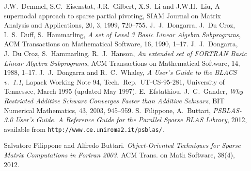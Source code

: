 \begin{thebibliography}{99}
J.W.~Demmel, S.C.~Eisenstat, J.R.~Gilbert, X.S.~Li and J.W.H.~Liu,
A supernodal approach to sparse partial pivoting,
SIAM Journal on Matrix Analysis and Applications, 20, 3, 1999, 720--755.
%
J.~J.~Dongarra, J.~Du Croz, I.~S.~Duff, S.~Hammarling,
\emph{A set of Level 3 Basic Linear Algebra Subprograms},
ACM Transactions on Mathematical Software, 16, 1990, 1--17.
%
J.~J.~Dongarra, J.~Du Croz, S.~Hammarling, R.~J.~Hanson,
\emph{An extended set of FORTRAN Basic Linear Algebra Subprograms},
ACM Transactions on Mathematical Software, 14, 1988, 1--17.
%
J.~J.~Dongarra and R.~C.~Whaley,
{\em A User's Guide to the BLACS v.~1.1},
Lapack Working Note 94, Tech.\ Rep.\ UT-CS-95-281, University of
Tennessee, March 1995 (updated May 1997).
%
%
%
E.~Efstathiou, J.~G.~Gander,
{\em Why Restricted Additive Schwarz Converges Faster than Additive Schwarz},
BIT Numerical Mathematics, 43, 2003, 945--959.
%
S.~Filippone, A.~Buttari, 
{\em PSBLAS-3.0 User's Guide. A Reference Guide for the Parallel Sparse BLAS Library}, 2012,
available from \texttt{http://www.ce.uniroma2.it/psblas/}.

Salvatore Filippone and Alfredo Buttari.
{\em {Object-Oriented Techniques for Sparse Matrix Computations in Fortran
  2003}.}
ACM Trans. on Math Software, 38(4), 2012.


\end{thebibliography}
